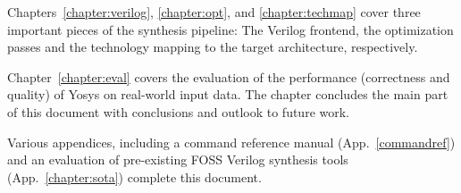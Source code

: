 Chapters~\ref{chapter:verilog}, \ref{chapter:opt}, and \ref{chapter:techmap} 
cover three important pieces of the synthesis pipeline: The Verilog frontend,
the optimization passes and the technology mapping to the target architecture,
respectively.

Chapter~\ref{chapter:eval} covers the evaluation of the performance
(correctness and quality) of Yosys on real-world input data.
The chapter concludes the main part of this document with conclusions and
outlook to future work.

Various appendices, including a command reference manual
(App.~\ref{commandref}) and an evaluation of pre-existing FOSS Verilog
synthesis tools (App.~\ref{chapter:sota}) complete this document.


